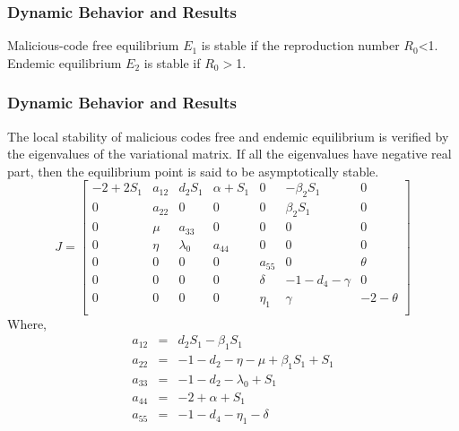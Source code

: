 \documentclass{beamer}
\begin{document}
\begin{frame}\frametitle{Dynamic Behavior and Results}
Malicious-code free equilibrium $E_1$ is stable if the reproduction number $R_0$\textless1.
Endemic equilibrium $E_2$ is stable if $R_0$$>$1.

\end{frame}
\begin{frame}\frametitle{Dynamic Behavior and Results}
The local stability of malicious codes
free and endemic equilibrium is verified by the eigenvalues of the
variational matrix. If all the eigenvalues have negative real part,
then the equilibrium point is said to be asymptotically stable.
\small
\[
J=
\begin{bmatrix}
-2+2 S_1&a_{12}&d_2 S_1&\alpha+S_1&0&-\beta_2 S_1&0\\
0&a_{22}&0&0&0&\beta_2 S_1&0\\
0&\mu&a_{33}&0&0&0&0\\
0&\eta&\lambda_0&a_{44}&0&0&0\\
0&0&0&0&a_{55}&0&\theta\\
0&0&0&0&\delta&-1-d_4-\gamma&0\\
0&0&0&0&\eta_1&\gamma&-2-\theta\\
\end{bmatrix}
\]
Where,
{\footnotesize \begin{eqnarray*}
a_{12}&=& d_2 S_1-\beta_1 S_1\\
a_{22}&=&-1-d_2-\eta-\mu+\beta_1 S_1+S_1 \\
a_{33}&=&-1-d_2-\lambda_0+S_1 \\
a_{44}&=&-2+\alpha+S_1\\
a_{55}&=&-1-d_4-\eta_1-\delta
\end{eqnarray*}}
\end{frame}
\end{document}
